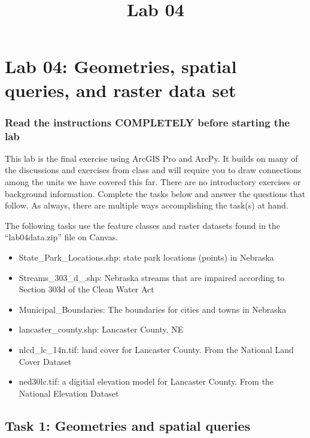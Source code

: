 \documentclass[]{article}
\title{Lab 04}
\author{}
\date{}
\makeatletter
\providecommand{\tightlist}{%
  \setlength{\itemsep}{0pt}\setlength{\parskip}{0pt}}
\renewcommand{\maketitle}{\bgroup\vspace*{-1cm}\setlength{\parindent}{0pt}
\begin{flushleft}
  \@author
  
  \@date
  
\end{flushleft}\egroup
}
\makeatother
\begin{document}
\maketitle

\hypertarget{lab-04-geometries-spatial-queries-and-raster-data-set}{%
\section{Lab 04: Geometries, spatial queries, and raster data
set}\label{lab-04-geometries-spatial-queries-and-raster-data-set}}

\hypertarget{read-the-instructions-completely-before-starting-the-lab}{%
\subsubsection{Read the instructions COMPLETELY before starting the
lab}\label{read-the-instructions-completely-before-starting-the-lab}}

This lab is the final exercise using ArcGIS Pro and ArcPy. It builds on
many of the discussions and exercises from class and will require you to
draw connections among the units we have covered this far. There are no
introductory exercises or background information. Complete the tasks
below and answer the questions that follow. As always, there are
multiple ways accomplishing the task(s) at hand.

The following tasks use the feature classes and raster datasets found in
the ``lab04data.zip'' file on Canvas.

\begin{itemize}
\tightlist
\item
  State\_Park\_Locations.shp: state park locations (points) in Nebraska
\item
  Streams\_303\_d\_.shp: Nebraska streams that are impaired according to
  Section 303d of the Clean Water Act
\item
  Municipal\_Boundaries: The boundaries for cities and towns in Nebraska
\item
  lancaster\_county.shp: Lancaster County, NE
\item
  nlcd\_lc\_14n.tif: land cover for Lancaster County. From the National
  Land Cover Dataset
\item
  ned30lc.tif: a digitial elevation model for Lancaster County. From the
  National Elevation Dataset
\end{itemize}

\hypertarget{task-1-geometries-and-spatial-queries}{%
\subsection{Task 1: Geometries and spatial
queries}\label{task-1-geometries-and-spatial-queries}}
\end{document}
